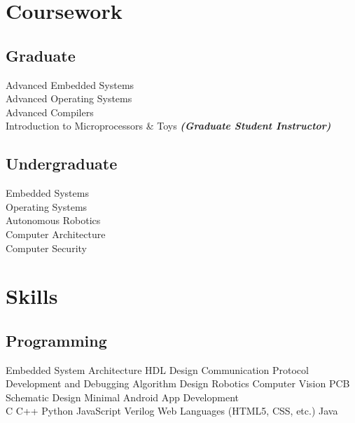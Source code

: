 \documentclass[]{deedy-resume-openfont}
\begin{document}
\begin{minipage}[t]{0.33\textwidth}

\section{Coursework}
\subsection{Graduate}
Advanced Embedded Systems \\
Advanced Operating Systems \\
Advanced Compilers \\
Introduction to Microprocessors \& Toys
{\footnotesize \textit{\textbf{(Graduate Student Instructor) }}} \\
\sectionsep

\subsection{Undergraduate}
Embedded Systems \\
Operating Systems \\
Autonomous Robotics \\
Computer Architecture \\
Computer Security \\
\sectionsep


\section{Skills}
\subsection{Programming}
Embedded System Architecture \textbullet{} HDL Design \textbullet{} Communication Protocol Development and Debugging \textbullet{} Algorithm Design \textbullet{} Robotics \textbullet{} Computer Vision \textbullet{} PCB Schematic Design \textbullet{} Minimal Android App Development\\ 
C \textbullet{} C++ \textbullet{} Python \textbullet{} JavaScript \textbullet{} Verilog \textbullet{} Web Languages (HTML5, CSS, etc.) \textbullet{} Java \\
\sectionsep

%
%

\end{minipage} 
\end{document}
